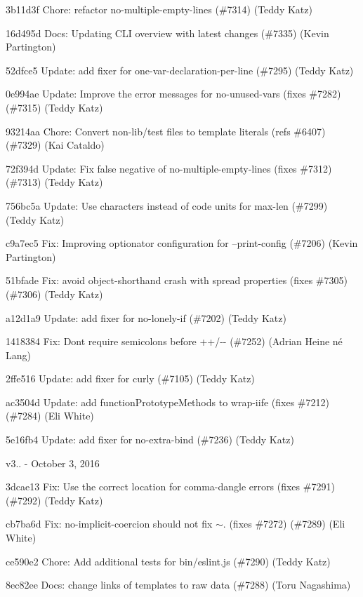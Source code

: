 \begin{DoxyItemize}
\item 3b11d3f Chore\+: refactor {\ttfamily no-\/multiple-\/empty-\/lines} (\#7314) (Teddy Katz)
\item 16d495d Docs\+: Updating C\+LI overview with latest changes (\#7335) (Kevin Partington)
\item 52dfce5 Update\+: add fixer for {\ttfamily one-\/var-\/declaration-\/per-\/line} (\#7295) (Teddy Katz)
\item 0e994ae Update\+: Improve the error messages for {\ttfamily no-\/unused-\/vars} (fixes \#7282) (\#7315) (Teddy Katz)
\item 93214aa Chore\+: Convert non-\/lib/test files to template literals (refs \#6407) (\#7329) (Kai Cataldo)
\item 72f394d Update\+: Fix false negative of {\ttfamily no-\/multiple-\/empty-\/lines} (fixes \#7312) (\#7313) (Teddy Katz)
\item 756bc5a Update\+: Use characters instead of code units for {\ttfamily max-\/len} (\#7299) (Teddy Katz)
\item c9a7ec5 Fix\+: Improving optionator configuration for --print-\/config (\#7206) (Kevin Partington)
\item 51bfade Fix\+: avoid {\ttfamily object-\/shorthand} crash with spread properties (fixes \#7305) (\#7306) (Teddy Katz)
\item a12d1a9 Update\+: add fixer for {\ttfamily no-\/lonely-\/if} (\#7202) (Teddy Katz)
\item 1418384 Fix\+: Don\textquotesingle{}t require semicolons before {\ttfamily ++}/{\ttfamily -\/-\/} (\#7252) (Adrian Heine né Lang)
\item 2ffe516 Update\+: add fixer for {\ttfamily curly} (\#7105) (Teddy Katz)
\item ac3504d Update\+: add function\+Prototype\+Methods to wrap-\/iife (fixes \#7212) (\#7284) (Eli White)
\item 5e16fb4 Update\+: add fixer for {\ttfamily no-\/extra-\/bind} (\#7236) (Teddy Katz)
\end{DoxyItemize}

v3.. -\/ October 3, 2016


\begin{DoxyItemize}
\item 3dcae13 Fix\+: Use the correct location for {\ttfamily comma-\/dangle} errors (fixes \#7291) (\#7292) (Teddy Katz)
\item cb7ba6d Fix\+: no-\/implicit-\/coercion should not fix $\sim$. (fixes \#7272) (\#7289) (Eli White)
\item ce590e2 Chore\+: Add additional tests for bin/eslint.\+js (\#7290) (Teddy Katz)
\item 8ec82ee Docs\+: change links of templates to raw data (\#7288) (Toru Nagashima)
\end{DoxyItemize}

